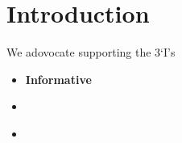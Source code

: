 \section{Introduction}
We adovocate supporting the 3`I's
\begin{itemize}
	\item \textbf{Informative}
	\item \textbf{}
	\item \textbf{}
\end{itemize}
